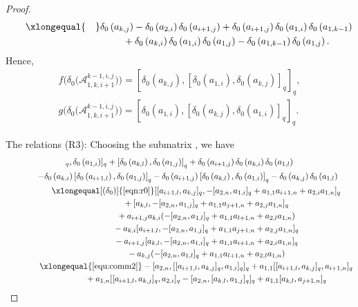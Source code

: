 \documentclass[pdftex]{sigma}
\numberwithin{equation}{section}
\def\lr#1{\left[#1\right]}
\def\lrb#1{\left(#1\right)}
\def\d{\delta}
\def\A{\mathscr{A}}
\begin{document}
\begin{proof}
\begin{gather*}
 \qquad\xlongequal{\quad} \d_0\lrb{a_{k,j}}-\d_0\lrb{a_{2,i}}\d_0\lrb{a_{i+1,j}} +\d_0\lrb{a_{i+1,j}}\d_0\lrb{a_{1,i}}\d_0\lrb{a_{1,k-1}}\\
 \phantom{ \qquad\xlongequal{\quad}}{} +\d_0\lrb{a_{k,i}}\d_0\lrb{a_{1,i}}\d_0\lrb{a_{1,j}} -\d_0\lrb{a_{1,k-1}}\d_0\lrb{a_{1,j}}.
\end{gather*}
Hence,
\begin{gather*}
f\bigl(\d_0\bigl(\A_{1,k,i+1}^{k-1,i,j}\bigr)\bigr)= [\d_0\lrb{a_{k, j}}, {\lr{\d_0\lrb{a_{1, i}}, \d_0\lrb{a_{k, j}}}}_q]_q,\\
 g\bigl(\d_0\bigl(\A_{1,k,i+1}^{k-1,i,j}\bigr)\bigr)=[\d_0\lrb{a_{1, i}}, {\lr{\d_0\lrb{a_{k, j}}, \d_0\lrb{ a_{1,i}}}}_q]_q.
\end{gather*}

The relations (R3):
Choosing the submatrix \smash{$\A_{1,k,i+1}^{i,j,l}(l\neq n)$}, we have
 \begin{gather*}
 [\lr{\d_0\lrb{a_{i+1,l}}, \d_0\lrb{a_{k,j}}}_q, \d_0\lrb{a_{1,i}}]_q+ \lr{\d_0\lrb{a_{k,l}}, \d_0\lrb{a_{1,j}}}_q +\d_0\lrb{a_{i+1,j}}\d_0\lrb{a_{k,i}} \d_0\lrb{a_{1,l}} \\
\qquad -\d_0\lrb{a_{k,i}}\lr{\d_0\lrb{a_{i+1,l}}, \d_0\lrb{a_{1,j}}}_q -\d_0\lrb{a_{i+1,j}}\lr{\d_0\lrb{a_{k,l}}, \d_0\lrb{a_{1,i}}}_q -\d_0\lrb{a_{k,j}} \d_0\lrb{a_{1,l}}\\
\qquad\qquad\xlongequal[(\d_0)]{\eqref{eqn:r0}} [ [a_{i+1,l}, a_{k,j} ]_q, - [a_{2,n},a_{1,i} ]_q+a_{1,1}a_{i+1,n}+a_{2,i}a_{1,n} ]_q\\
\phantom{\qquad\qquad\qquad\ }{} + [a_{k,l}, - [a_{2,n},a_{1,j} ]_q+a_{1,1}a_{j+1,n}+a_{2,j}a_{1,n} ]_q\\
\phantom{\qquad\qquad\qquad\ }{} +a_{i+1,j}a_{k,i} (- [a_{2,n},a_{1,l} ]_q+a_{1,1}a_{l+1,n}+a_{2,l}a_{1,n} ) \\
\phantom{\qquad\qquad\qquad\ }{} -a_{k,i} [a_{i+1,l}, - [a_{2,n},a_{1,j} ]_q+a_{1,1}a_{j+1,n}+a_{2,j}a_{1,n} ]_q \\
\phantom{\qquad\qquad\qquad\ }{}-a_{i+1,j} [a_{k,l},- [a_{2,n},a_{1,i} ]_q+a_{1,1}a_{i+1,n}+a_{2,i}a_{1,n} ]_q \\
\phantom{\qquad\qquad\qquad\ }{} -a_{k,j} (- [a_{2,n},a_{1,l} ]_q+a_{1,1}a_{l+1,n}+a_{2,l}a_{1,n} )\\
\qquad\qquad \xlongequal{\eqref{equ:comm2}} - [a_{2,n}, [ [a_{i+1,l}, a_{k,j} ]_q,a_{1,i} ]_q ]_q +a_{1,1} [ [a_{i+1,l}, a_{k,j} ]_q, a_{i+1,n} ]_q \\
 \phantom{\qquad\qquad \qquad\ }{} +a_{1,n} [ [a_{i+1,l}, a_{k,j} ]_q, a_{2,i} ]_q - [a_{2,n}, [a_{k,l},a_{1,j} ]_q ]_q +a_{1,1} [a_{k,l},a_{j+1,n} ]_q\\

\end{gather*}
\end{proof}
\end{document}
